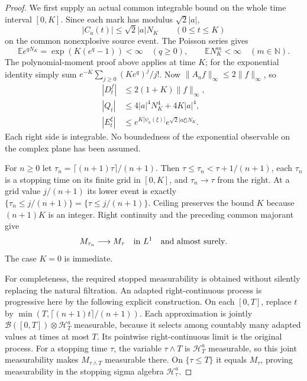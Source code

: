 \documentclass[11pt]{article}
\newcommand{\E}{\mathbb E}\newcommand{\Pp}{\mathbb P}
\begin{document}
\begin{proof}
We first supply an actual common integrable bound on the whole
time interval $[0,K]$. Since each mark has modulus $\sqrt2|a|$,
\[
 |C_a(t)|\leq\sqrt2|a|N_K\qquad(0\leq t\leq K)
\]
on the common nonexplosive source event. The Poisson series gives
\[
 \E e^{qN_K}=\exp(K(e^q-1))<\infty\quad(q\geq0),
 \qquad \E N_K^m<\infty\quad(m\in\mathbb N).
\]
The polynomial-moment proof above applies at time $K$; for the
exponential identity simply sum
$e^{-K}\sum_{j\geq0}(Ke^q)^j/j!$.
Now $\|A_af\|_\infty\leq2\|f\|_\infty$, so
\begin{align*}
 |D_t^f|&\leq2(1+K)\|f\|_\infty,\\
 |Q_t|&\leq4|a|^4N_K^4+4K|a|^4,\\
 |E_t^\xi|&\leq e^{K|\psi_a(\xi)|}
                   e^{\sqrt2|a\xi|N_K}.
\end{align*}
Each right side is integrable. No boundedness of the exponential
observable on the complex plane has been assumed.

For $n\geq0$ let
$\tau_n=\lceil(n+1)\tau\rceil/(n+1)$.
Then $\tau\leq\tau_n<\tau+1/(n+1)$, each $\tau_n$ is a stopping
time on its finite grid in $[0,K]$, and $\tau_n\to\tau$ from the
right. At a grid value $j/(n+1)$ its lower event is exactly
$\{\tau_n\leq j/(n+1)\}=\{\tau\leq j/(n+1)\}$.
Ceiling preserves the bound $K$ because $(n+1)K$ is an integer.
Right continuity and the preceding common majorant give
\begin{equation}\label{eq:roundedLone}
 M_{\tau_n}\longrightarrow M_\tau\quad\hbox{in }L^1
 \quad\hbox{and almost surely}.
\end{equation}
The case $K=0$ is immediate.

For completeness, the required stopped measurability is obtained
without silently replacing the natural filtration. An adapted
right-continuous process is progressive here by the following explicit
construction. On each $[0,T]$, replace $t$ by
$\min(T,\lceil(n+1)t\rceil/(n+1))$. Each approximation is jointly
$\mathcal B([0,T])\otimes\mathcal H_T^a$ measurable, because it
selects among countably many adapted values at times at most $T$.
Its pointwise right-continuous limit is the original process. For a
stopping time $\tau$, the variable $\tau\wedge T$ is
$\mathcal H_T^a$ measurable, so this joint measurability makes
$M_{\tau\wedge T}$ measurable there. On $\{\tau\leq T\}$ it
equals $M_\tau$, proving measurability in the stopping sigma algebra
$\mathcal H_\tau^a$.


\end{proof}
\end{document}
